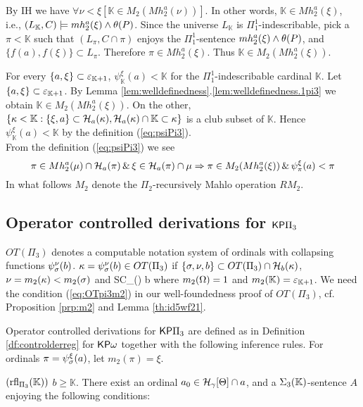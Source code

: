 \documentclass{article}
\newcommand{\mK}{\mathbb{K}}
\begin{document}
By IH we have $\forall \nu<\xi[\mK\in M_{2}(Mh^{a}_{2}(\nu))]$.
In other words, $\mK\in Mh^{a}_{2}(\xi)$, i.e., $(L_{\mK},C)\models mh^{a}_{2}(\xi)\land \tht(P)$.
Since the universe $L_{\mK}$ is $\Pi^{1}_{1}$-indescribable, pick a $\pi<\mK$ such that
$(L_{\pi},C\cap\pi)$ enjoys the $\Pi^{1}_{1}$-sentence $mh^{a}_{2}(\xi)\land \theta(P)$, 
and $\{f(a),f(\xi)\}\subset L_{\pi}$.
Therefore  $\pi\in Mh^{a}_{2}(\xi)$.
Thus $\mK\in M_{2}(Mh^{a}_{2}(\xi))$.
\eprf

\blem\label{lem:psiK}
For every $\{a,\xi\}\subset\veps_{\mK+1}$,
$\psi_{\mK}^{\xi}(a)<\mK$ for the $\Pi^{1}_{1}$-indescribable cardinal $\mK$.
\elem
\bprf
Let $\{a,\xi\}\subset\veps_{\mK+1}$.
By Lemma \ref{lem:welldefinedness}.\ref{lem:welldefinedness.1pi3} we obtain
$\mK\in M_{2}(Mh^{a}_{2}(\xi))$.
On the other, $\{\kap<\mK: \{\xi,a\}\subset\calh_{a}(\kap),
\calh_{a}(\kap)\cap\mK\subset\kap\}$ is a club subset of $\mK$.
Hence $\psi_{\mK}^{\xi}(a)<\mK$ by
the definition (\ref{eq:psiPi3}).
\eprf
\\

From the definition (\ref{eq:psiPi3}) we see
\[
\pi\in Mh_{2}^{a}(\mu)\cap {\cal H}_{a}(\pi) \,\&\, \xi\in {\cal H}_{a}(\pi)\cap\mu
\Rightarrow \pi\in M_{2}(Mh_{2}^{a}(\xi))\,\&\, \psi_{\pi}^{\xi}(a)<\pi
\]
In what follows $M_{2}$ denote the $\Pi_{2}$-recursively Mahlo operation $RM_{2}$.

\subsection{Operator controlled derivations for ${\sf KP}\Pi_{3}$}
$OT(\Pi_{3})$ denotes a computable notation system of ordinals with
collapsing functions $\psi_{\sigma}^{\nu}(b)$.
$\kappa=\psi_{\sigma}^{\nu}(b)\in OT(\Pi_{3})$ 
if $\{\sigma,\nu,b\}\subset OT(\Pi_{3})\cap{\cal H}_{b}(\kappa)$, 
$\nu=m_{2}(\kappa)<m_{2}(\sigma)$
and
\beqn\label{eq:OTpi3m2}
SC_{\mK}(\nu)\subset\kap
\spand \nu\leq b
\eeqn
where $m_{2}(\Omega)=1$ and
$m_{2}(\mK)=\veps_{\mK+1}$.
We need the condition (\ref{eq:OTpi3m2}) in our well-foundedness proof of $OT(\Pi_{3})$, 
cf.\,Proposition \ref{prp:m2} and Lemma \ref{th:id5wf21}.

Operator controlled derivations for ${\sf KP}\Pi_{3}$ are defined as in 
Definition \ref{df:controlderreg} for ${\sf KP}\omega$ together with the following inference rules.
For ordinals $\pi=\psi_{\sigma}^{\xi}(a)$, let
$m_{2}(\pi)=\xi$.






\bdes
\item[$({\rm rfl}_{\Pi_{3}}(\mK))$]
$b\geq\mK$.
There exist 
an ordinal $a_{0}\in{\cal H}_{\gamma}[\Theta]\cap a$,
and a $\Sig_{3}(\mK)$-sentence $A$ enjoying the following conditions:
\end{document}
